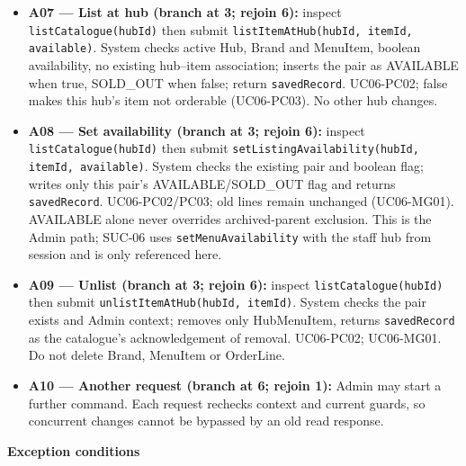 \begin{itemize}
\item \textbf{A07 --- List at hub (branch at 3; rejoin 6):} inspect \texttt{listCatalogue(hubId)} then submit \texttt{listItemAtHub(hubId, itemId, available)}. System checks active Hub, Brand and MenuItem, boolean availability, no existing hub--item association; inserts the pair as AVAILABLE when true, SOLD\_OUT when false; return \texttt{savedRecord}. UC06-PC02; false makes this hub's item not orderable (UC06-PC03). No other hub changes.

\item \textbf{A08 --- Set availability (branch at 3; rejoin 6):} inspect \texttt{listCatalogue(hubId)} then submit \texttt{setListingAvailability(hubId, itemId, available)}. System checks the existing pair and boolean flag; writes only this pair's AVAILABLE/SOLD\_OUT flag and returns \texttt{savedRecord}. UC06-PC02/PC03; old lines remain unchanged (UC06-MG01). AVAILABLE alone never overrides archived-parent exclusion. This is the Admin path; SUC-06 uses \texttt{setMenuAvailability} with the staff hub from session and is only referenced here.

\item \textbf{A09 --- Unlist (branch at 3; rejoin 6):} inspect \texttt{listCatalogue(hubId)} then submit \texttt{unlistItemAtHub(hubId, itemId)}. System checks the pair exists and Admin context; removes only HubMenuItem, returns \texttt{savedRecord} as the catalogue's acknowledgement of removal. UC06-PC02; UC06-MG01. Do not delete Brand, MenuItem or OrderLine.

\item \textbf{A10 --- Another request (branch at 6; rejoin 1):} Admin may start a further command. Each request rechecks context and current guards, so concurrent changes cannot be bypassed by an old read response.

\end{itemize}
\textbf{Exception conditions}

